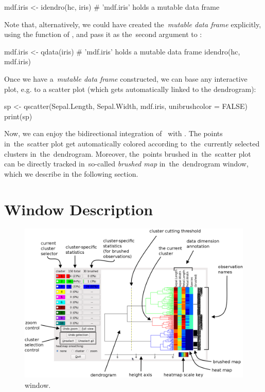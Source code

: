 \documentclass[article]{jss}
\newcommand{\myemph}[1]{\emph{#1}}
\newcommand{\Rfunction}[1]{\code{#1}}
\begin{document}
\begin{Code}
    mdf.iris <- idendro(hc, iris)
    # 'mdf.iris' holds a mutable data frame
\end{Code}

Note that, alternatively, we could have created the~\myemph{mutable
data frame} explicitly, using the \Rfunction{qdata} function of
, and pass it as the~second argument to \Rfunction{idendro}:

\begin{Code}
    mdf.iris <- qdata(iris)
    # 'mdf.iris' holds a mutable data frame
    idendro(hc, mdf.iris)
\end{Code}

Once we have a~\myemph{mutable data frame} constructed, we can base any
 interactive plot, e.g. to a scatter plot (which gets
automatically linked to the dendrogram):

\begin{Code}
    sp <- qscatter(Sepal.Length, Sepal.Width, mdf.iris, unibrushcolor = FALSE)
    print(sp)
\end{Code}

Now, we can enjoy the bidirectional integration of~ with
. The points in~the~scatter plot get automatically
colored according to~the~currently selected clusters in~the~dendrogram.
Moreover, the~points brushed in~the~scatter plot can be directly
tracked in~so-called \myemph{brushed map} in~the~dendrogram window,
which we describe in the following section.

\section[idendro Window Description]{\Rfunction{idendro} Window Description}

\begin{figure}[ht]
\centering
\includegraphics[width=1\linewidth]{pic/idendro}
\caption{ window.}
\label{fig:idendro_window}
\end{figure}
\end{document}
